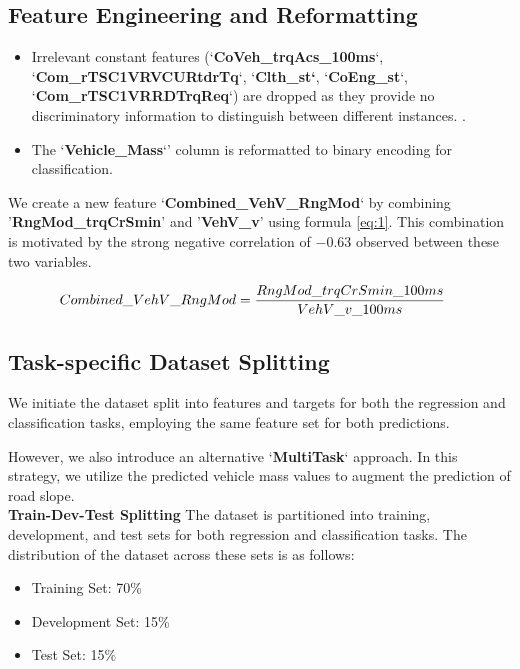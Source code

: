 \documentclass[conference]{IEEEtran}
\begin{document}
\subsection{Feature Engineering and Reformatting}
\begin{itemize}
\item Irrelevant constant features (`\textbf{CoVeh\_trqAcs\_100ms}`, `\textbf{Com\_rTSC1VRVCURtdrTq}`, `\textbf{Clth\_st`}, `\textbf{CoEng\_st}`, `\textbf{Com\_rTSC1VRRDTrqReq}`) are dropped as they provide no discriminatory information to distinguish between different instances. . 

\item The `\textbf{Vehicle\_Mass}`' column is reformatted to binary encoding for classification.


\end{itemize}

We create a new feature `\textbf{Combined\_VehV\_RngMod}` by combining '\textbf{RngMod\_trqCrSmin}' and '\textbf{VehV\_v}' using formula \ref{eq:1}. This combination is motivated by the strong negative correlation of $-0.63$ observed between these two variables.

\begin{equation} \label{eq:1}
    \hspace{-1em} Combined\_VehV\_RngMod = \dfrac{RngMod\_trqCrSmin\_100ms}{VehV\_v\_100ms}
\end{equation}

\subsection{Task-specific Dataset Splitting}
We initiate the dataset split into features and targets for both the regression and classification tasks, employing the same feature set for both predictions. 

However, we also introduce an alternative `\textbf{MultiTask}` approach. In this strategy, we utilize the predicted vehicle mass values to augment the prediction of road slope. \\

\noindent \textbf{Train-Dev-Test Splitting} \hspace{0.2em} The dataset is partitioned into training, development, and test sets for both regression and classification tasks. The distribution of the dataset across these sets is as follows:

\begin{itemize}
    \item Training Set: 70\%
    \item Development Set: 15\%
    \item Test Set: 15\%
\end{itemize}
\end{document}
